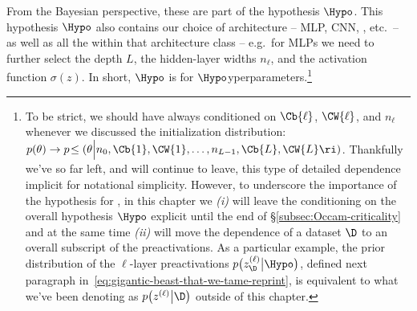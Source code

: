 From the Bayesian perspective, these  are part of the hypothesis $\Hypo$.
This hypothesis $\Hypo$ also contains
our choice of architecture -- MLP, CNN, , etc.~-- as well as all the  within that architecture class -- e.g.~for MLPs we need to further select the depth $L$, the hidden-layer widths $n_\ell$, and the activation function $\sigma(z)$.
In short, $\Hypo$ is for $\Hypo$yperparameters.\footnote{
To be strict, we should have always conditioned on 
$\Cb{\ell}$, $\CW{\ell}$, and $n_{\ell}$
whenever we discussed the initialization distribution: $p(\theta) \to p\!\le(\theta\Big\vert  n_0, \Cb{1}, \CW{1}, \ldots, n_{L-1}, \Cb{L}, \CW{L} \ri)$. 
Thankfully we've so far left, and will continue to leave, this type of detailed dependence implicit for notational simplicity. However, to underscore the importance of the hypothesis for , in this chapter we \emph{(i)} will leave the conditioning on the overall hypothesis $\Hypo$ explicit until the end of \S\ref{subsec:Occam-criticality} 
and at the same time 
\emph{(ii)} will move the dependence of a dataset $\D$ to an overall subscript of the preactivations. 
As a particular example, the prior distribution of the $\ell$-layer preactivations $p\big(z^{(\ell)}_{\D} \big| \Hypo \big)$, defined next paragraph in~\eqref{eq:gigantic-beast-that-we-tame-reprint}, is equivalent to
what we've been denoting as $p\big(z^{(\ell)} \big| \D \big)$ outside of this chapter.
}



